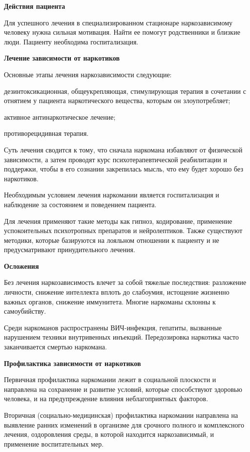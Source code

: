 \textbf{Действия пациента}

Для успешного лечения в специализированном стационаре наркозависимому человеку нужна сильная мотивация. Найти ее помогут родственники и близкие люди. Пациенту необходима госпитализация.

\textbf{Лечение зависимости от наркотиков}

Основные этапы лечения наркозависимости следующие:

дезинтоксикационная, общеукрепляющая, стимулирующая терапия в сочетании с отнятием у пациента наркотического вещества, которым он злоупотребляет;

активное антинаркотическое лечение;

противорецидивная терапия.

Суть лечения сводится к тому, что сначала наркомана избавляют от физической зависимости, а затем проводят курс психотерапевтической реабилитации и поддержки, чтобы в его сознании закрепилась мысль, что ему будет хорошо без наркотиков.

Необходимым условием лечения наркомании является госпитализация и наблюдение за состоянием и поведением пациента.

Для лечения применяют такие методы как гипноз, кодирование, применение успокоительных психотропных препаратов и нейролептиков. Также существуют методики, которые базируются на лояльном отношении к пациенту и не предусматривают принудительного лечения.

\textbf{Осложения}

Без лечения наркозависимость влечет за собой тяжелые последствия: разложение личности, снижение интеллекта вплоть до слабоумия, истощение жизненно важных органов, снижение иммунитета. Многие наркоманы склонны к самоубийству.

Среди наркоманов распространены ВИЧ-инфекция, гепатиты, вызванные нарушением техники внутривенных инъекций. Передозировка наркотика часто заканчивается смертью наркомана.

\textbf{Профилактика зависимости от наркотиков}

Первичная профилактика наркомании лежит в социальной плоскости и направлена на сохранение и развитие условий, которые способствуют здоровью человека, и на предупреждение влияния неблагоприятных факторов.

Вторичная (социально-медицинская) профилактика наркомании направлена на выявление ранних изменений в организме для срочного полного и комплексного лечения, оздоровления среды, в которой находится наркозависимый, и применение воспитательных мер.

